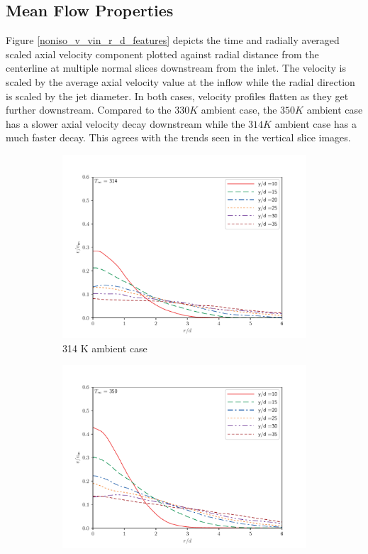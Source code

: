 \subsection{Mean Flow Properties}
Figure \ref{noniso_v_vin_r_d_features} depicts the time and radially averaged scaled axial velocity component plotted against radial distance from the centerline at multiple normal slices downstream from the inlet. The velocity is scaled by the average axial velocity value at the inflow while the radial direction is scaled by the jet diameter. In both cases, velocity profiles flatten as they get further downstream. Compared to the $330 K$ ambient case, the $350 K$ ambient case has a slower axial velocity decay downstream while the $314 K$ ambient case has a much faster decay. This agrees with the trends seen in the vertical slice images. 
\begin{figure}[H]
\begin{center}
\begin{subfigure}{0.45\textwidth}
	\includegraphics[scale=.45]{figures/Plots/radial/slices_5/314_ambient/ur_u_in_vs_r_d.pdf}
	\caption{314 K ambient case} \label{noniso_v_vin_r_d_1}
\end{subfigure}
\begin{subfigure}{0.45\textwidth}
	\includegraphics[scale=.45]{figures/Plots/radial/slices_5/350_ambient/ur_u_in_vs_r_d.pdf}

\end{subfigure}
\end{center}
\end{figure}
